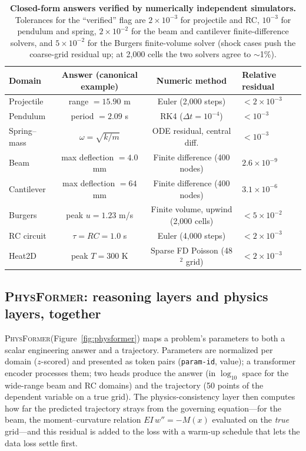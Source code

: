 \documentclass[11pt,a4paper]{article}
\newcommand{\PhysFormer}{\textsc{PhysFormer}}
\begin{document}
\begin{table}[t]
\centering
\small
\begin{tabular}{lccl}
\toprule
Domain & Answer (canonical example) & Numeric method & Relative residual \\
\midrule
Projectile & range $=15.90$ m & Euler (2,000 steps) & $<2\times10^{-3}$ \\
Pendulum & period $=2.09$ s & RK4 ($\Delta t=10^{-4}$) & $<10^{-3}$ \\
Spring--mass & $\omega=\sqrt{k/m}$ & ODE residual, central diff. & $<10^{-3}$ \\
Beam & max deflection $=4.0$ mm & Finite difference (400 nodes) & $2.6\times10^{-9}$ \\
Cantilever & max deflection $=64$ mm & Finite difference (400 nodes) & $3.1\times10^{-6}$ \\
Burgers & peak $u=1.23$ m/s & Finite volume, upwind (2,000 cells) & $<5\times10^{-2}$ \\
RC circuit & $\tau=RC=1.0$ s & Euler (4,000 steps) & $<2\times10^{-3}$ \\
Heat2D & peak $T=300$ K & Sparse FD Poisson (48$^2$ grid) & $<2\times10^{-3}$ \\
\bottomrule
\end{tabular}
\caption{\textbf{Closed-form answers verified by numerically independent
simulators.} Tolerances for the ``verified'' flag are $2\times10^{-3}$ for
projectile and RC, $10^{-3}$ for pendulum and spring, $2\times10^{-2}$
for the beam and cantilever finite-difference solvers, and $5\times10^{-2}$
for the Burgers finite-volume solver (shock cases push the coarse-grid
residual up; at 2{,}000 cells the two solvers agree to $\sim$1\%).}
\label{tab:verify}
\end{table}

\subsection{\PhysFormer: reasoning layers and physics layers, together}

\PhysFormer (Figure~\ref{fig:physformer}) maps a problem's parameters to
both a scalar engineering answer and a trajectory. Parameters are
normalized per domain ($z$-scored) and presented as token pairs
(\texttt{param-id}, value); a transformer encoder processes them; two heads
produce the answer (in $\log_{10}$ space for the wide-range beam and RC
domains) and the trajectory (50 points of the dependent variable on a true
grid). The physics-consistency layer then computes how far the predicted
trajectory strays from the governing equation---for the beam, the
moment--curvature relation $EI\,w''=-M(x)$ evaluated on the \emph{true}
grid---and this residual is added to the loss with a warm-up schedule that
lets the data loss settle first.
\end{document}
